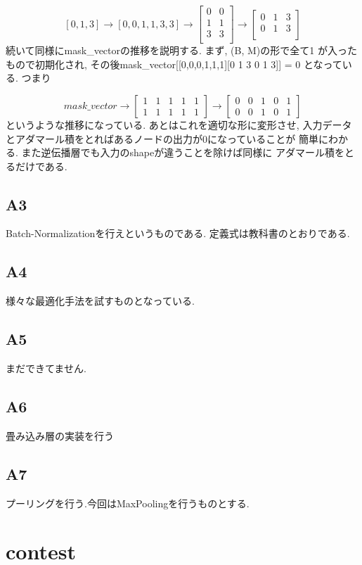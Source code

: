 \documentclass[a4paper,11pt]{jsarticle}
\begin{document}
$$
[0, 1, 3] \rightarrow [0, 0, 1, 1, 3, 3] \rightarrow 
\begin{bmatrix}
  0 & 0 \\
  1 & 1 \\
  3 & 3 \\
\end{bmatrix}
\rightarrow \begin{bmatrix}
  0 & 1 & 3 \\
  0 & 1 & 3 \\
\end{bmatrix}
$$
続いて同様にmask\_vectorの推移を説明する. まず, (B, M)の形で全て1
が入ったもので初期化され, その後mask\_vector[[0,0,0,1,1,1][0 1 3 0 1 3]] = 0
となっている. つまり

$$
  mask\_vector \rightarrow \begin{bmatrix}
    1 & 1 & 1 & 1 & 1 \\
    1 & 1 & 1 & 1 & 1
  \end{bmatrix} \rightarrow
  \begin{bmatrix}
    0 & 0 & 1 & 0 & 1 \\
    0 & 0 & 1 & 0 & 1
  \end{bmatrix}
$$
というような推移になっている. あとはこれを適切な形に変形させ, 
入力データとアダマール積をとればあるノードの出力が0になっていることが
簡単にわかる. また逆伝播層でも入力のshapeが違うことを除けば同様に
アダマール積をとるだけである.
\subsection{A3}
Batch-Normalizationを行えというものである.
定義式は教科書のとおりである. 
\subsection{A4}
様々な最適化手法を試すものとなっている.
\subsection{A5}
まだできてません.
\subsection{A6}
畳み込み層の実装を行う
\subsection{A7}
プーリングを行う.今回はMaxPoolingを行うものとする.

\section{contest}
\end{document}
